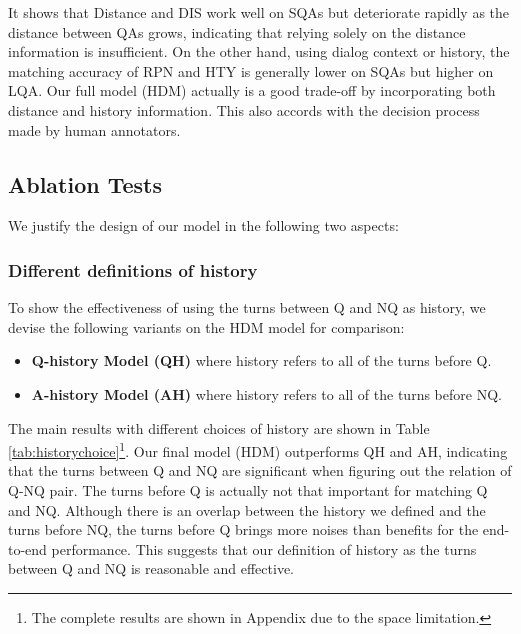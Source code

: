 It shows that Distance and DIS work well on SQAs but deteriorate rapidly 
as the distance between QAs grows, indicating that relying solely on 
the distance information is insufficient. 
On the other hand, using dialog context or history, 
the matching accuracy of RPN and HTY is generally lower on SQAs but higher on 
LQA. Our full model (HDM) actually is a good trade-off 
by incorporating both distance and history information. This also accords 
with the decision process made by human annotators.

\subsection{Ablation Tests}
We justify the design of our model in the following two aspects:

\subsubsection*{Different definitions of history}

To show the effectiveness of using the turns between Q and NQ 
as history, we devise the following variants on the HDM model 
for comparison:
\begin{itemize}
	\item \textbf{Q-history Model (QH)} where history refers to all of the turns before Q.%
	\item \textbf{A-history Model (AH)} where history refers to all of the turns before NQ.%
\end{itemize}

The main results with different choices of history are shown in Table \ref{tab:historychoice}\footnote{The complete results are shown in Appendix due to the space limitation.}.%
Our final model (HDM) outperforms QH and AH, indicating that the turns between Q and NQ are significant when figuring out the relation of Q-NQ pair. The turns before Q is actually not that important for matching Q and NQ. 
Although there is an overlap between the history we defined and 
the turns before NQ, 
the turns before Q brings more noises than benefits for
the end-to-end performance. This suggests that our definition of 
history as the turns between Q and NQ is reasonable and effective.

